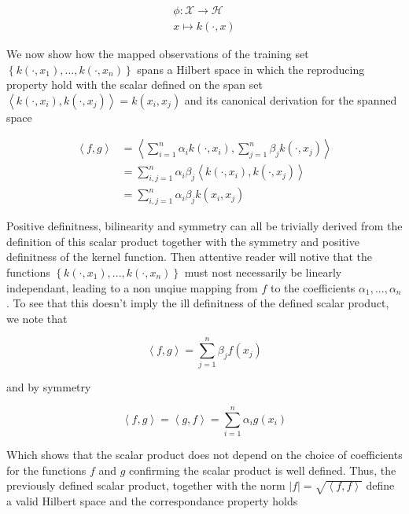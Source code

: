 \begin{equation}
  \begin{aligned}
    \phi : \mathcal{X} \rightarrow \mathcal{H}\\
    x \mapsto k(\cdot, x)
  \end{aligned}
\end{equation}

We now show how the mapped observations of the training set $\left\{k\left(\cdot, x_1\right), ..., k\left(\cdot, x_n\right)\right\}$ spans a Hilbert space in which the reproducing property hold with the scalar defined on the span set $\left<k\left(\cdot, x_i\right), k\left(\cdot, x_j\right)\right> = k\left(x_i, x_j\right)$ and its canonical derivation for the spanned space

\begin{equation*}
  \begin{aligned}
    \left<f, g\right>
    &= \left<\sum_{i=1}^n\alpha_ik(\cdot, x_i), \sum_{j=1}^n\beta_jk(\cdot, x_j)\right>\\
    &= \sum_{i,j=1}^n\alpha_i\beta_j \left<k\left(\cdot, x_i\right), k\left(\cdot, x_j\right)\right> \\
    &= \sum_{i,j=1}^n\alpha_i\beta_j k\left(x_i, x_j\right)
  \end{aligned}
\end{equation*}

Positive definitness, bilinearity and symmetry can all be trivially derived from the definition of this scalar product together with the symmetry and positive definitness of the kernel function. Then attentive reader will notive that the functions $\left\{k\left(\cdot, x_1\right), ..., k\left(\cdot, x_n\right)\right\}$ must nost necessarily be linearly independant, leading to a non unqiue mapping from $f$ to the coefficients $\alpha_1, ..., \alpha_n$. To see that this doesn't imply the ill definitness of the defined scalar product, we note that

\begin{equation*}
  \left<f, g\right> = \sum_{j=1}^n\beta_j f\left(x_j\right)
\end{equation*}

and by symmetry

\begin{equation*}
  \left<f, g\right> = \left<g, f\right> = \sum_{i=1}^n\alpha_i g\left(x_i\right)
\end{equation*}

Which shows that the scalar product does not depend on the choice of coefficients for the functions $f$ and $g$ confirming the scalar product is well defined. Thus, the previously defined scalar product, together with the norm $|f| = \sqrt{\left<f, f\right>}$ define a valid Hilbert space and the correspondance property holds

